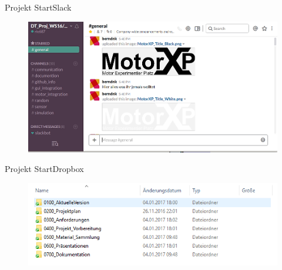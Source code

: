   \begin{frame}{Projekt Start}{Slack}
\begin{figure} [htbp]
 \centering
 \includegraphics[scale=0.35]{../projectdefinition/Bilder/Slack.png}
\end{figure}
 \end{frame}
   \begin{frame}{Projekt Start}{Dropbox}
\begin{figure} [htbp]
 \centering
 \includegraphics[scale=0.5]{../projectdefinition/Bilder/FolderStructure.png}
\end{figure}
 \end{frame}